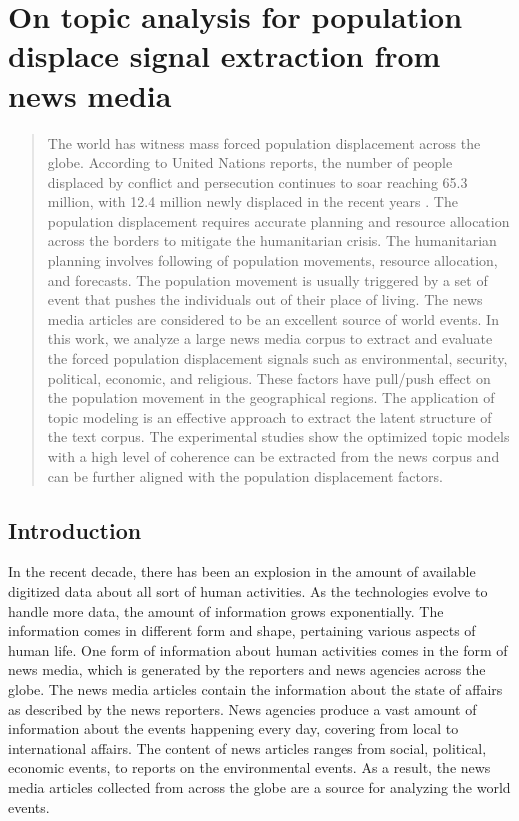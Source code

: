 \chapter{On topic analysis for population displace signal extraction from news media}

\begin{abstract}
The world has witness mass forced population displacement across the globe. According to United Nations reports, the number of people displaced by conflict and persecution continues to soar reaching 65.3 million, with 12.4 million newly displaced in the recent years \cite{unrefugeeagency2016}. The population displacement requires accurate planning and resource allocation across the borders to mitigate the humanitarian crisis. The humanitarian planning involves following of population movements, resource allocation, and forecasts. The population movement is usually triggered by a set of event that pushes the individuals out of their place of living. The news media articles are considered to be an excellent source of world events. In this work, we analyze a large news media corpus to extract and evaluate the forced population displacement signals such as environmental, security, political, economic, and religious. These factors have pull/push effect on the population movement in the geographical regions. The application of topic modeling is an effective approach to extract the latent structure of the text corpus. The experimental studies show the optimized topic models with a high level of coherence can be extracted from the news corpus and can be further aligned with the population displacement factors.    
\end{abstract}

\section{Introduction}

In the recent decade, there has been an explosion in the amount of available digitized data about all sort of human activities. As the technologies evolve to handle more data, the amount of information grows exponentially. The information comes in different form and shape, pertaining various aspects of human life. One form of information about human activities comes in the form of news media, which is generated by the reporters and news agencies across the globe. The news media articles contain the information about the state of affairs as described by the news reporters. News agencies produce a vast amount of information about the events happening every day, covering from local to international affairs. The content of news articles ranges from social, political, economic events,  to reports on the environmental events. As a result, the news media articles collected from across the globe are a source for analyzing the world events. 

